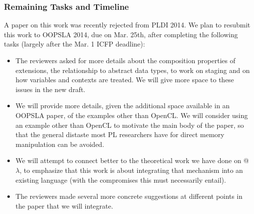 \subsubsection{Remaining Tasks and Timeline}
A paper on this work was recently rejected from PLDI 2014. We plan to resubmit this work to OOPSLA 2014, due on Mar. 25th, after completing the following tasks (largely after the Mar. 1 ICFP deadline):
\begin{itemize}
\item The reviewers asked for more details about the composition properties of extensions, the relationship to abstract data types, to work on staging and on how variables and contexts are treated. We will give more space to these issues in the new draft.
\item We will provide more details, given the additional space available in an OOPSLA paper, of the examples other than OpenCL. We will consider using an example other than OpenCL to motivate the main body of the paper, so that the general distaste most PL researchers have for direct memory manipulation can be avoided. 
\item We will attempt to connect better to the theoretical work we have done on @$\lambda$, to emphasize that this work is about integrating that mechanism into an existing language (with the compromises this must necessarily entail).
\item The reviewers made several more concrete suggestions at different points in the paper that we will integrate.
\end{itemize}
